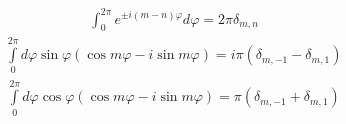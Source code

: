 \begin{equation} \begin{aligned} \label{eq:int_exp0}
\int_{0}^{2\pi} e^{\pm i (m-n) \varphi} d \varphi = 2 \pi \delta_{m,n} 
\end{aligned} \end{equation}
%
\begin{equation} \begin{aligned} \label{eq:int_exp1}
\int \limits_{0}^{2\pi} d \varphi \sin \varphi 
\left( \cos m \varphi - i \sin m \varphi \right) = 
i \pi \left( \delta_{m,-1} - \delta_{m,1} \right)
\end{aligned} \end{equation}
%
%
\begin{equation} \begin{aligned} \label{eq:int_exp2}
\int \limits_{0}^{2\pi} d \varphi \cos \varphi 
( \cos m \varphi - i \sin m \varphi) = \pi ( \delta_{m,-1} + \delta_{m,1} )
\end{aligned} \end{equation}
%

